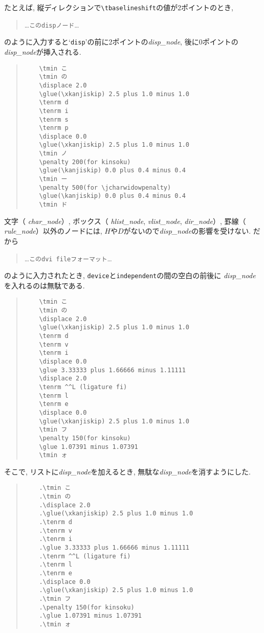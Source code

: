 たとえば, 縦ディレクションで\verb|\tbaselineshift|の値が2ポイントのとき,
\begin{quote}\gt
	\ldots\verb|このdispノード|\ldots
\end{quote}
のように入力すると`\verb|disp|'の前に2ポイントの{\it disp\_node\/},
後に0ポイントの{\it disp\_node\/}が挿入される.
\begin{quote}\gt\begin{verbatim}
	\tmin こ
	\tmin の
	\displace 2.0
	\glue(\xkanjiskip) 2.5 plus 1.0 minus 1.0
	\tenrm d
	\tenrm i
	\tenrm s
	\tenrm p
	\displace 0.0
	\glue(\xkanjiskip) 2.5 plus 1.0 minus 1.0
	\tmin ノ
	\penalty 200(for kinsoku)
	\glue(\kanjiskip) 0.0 plus 0.4 minus 0.4
	\tmin ー
	\penalty 500(for \jcharwidowpenalty)
	\glue(\kanjiskip) 0.0 plus 0.4 minus 0.4
	\tmin ド
\end{verbatim} \end{quote}
文字（\kern0pt {\it char\_node\/}）,
ボックス（\kern0pt {\it hlist\_node\/}, {\it vlist\_node\/}, {\it dir\_node\/}）,
罫線（\kern0pt {\it rule\_node\/}）以外のノードには,
$H$や$D$がないので{\it disp\_node\/}の影響を受けない.
だから
\begin{quote}\gt
	\ldots\verb|このdvi fileフォーマット|\ldots
\end{quote}
のように入力されたとき, \verb|device|と\verb|independent|の間の空白の前後に
{\it disp\_node\/}を入れるのは無駄である.
\begin{quote}\gt\begin{verbatim}
	\tmin こ
	\tmin の
	\displace 2.0
	\glue(\xkanjiskip) 2.5 plus 1.0 minus 1.0
	\tenrm d
	\tenrm v
	\tenrm i
	\displace 0.0
	\glue 3.33333 plus 1.66666 minus 1.11111
	\displace 2.0
	\tenrm ^^L (ligature fi)
	\tenrm l
	\tenrm e
	\displace 0.0
	\glue(\xkanjiskip) 2.5 plus 1.0 minus 1.0
	\tmin フ
	\penalty 150(for kinsoku)
	\glue 1.07391 minus 1.07391
	\tmin ォ
\end{verbatim} \end{quote}
そこで, リストに{\it disp\_node\/}を加えるとき,
無駄な{\it disp\_node\/}を消すようにした.
\begin{quote}\gt\begin{verbatim}
	.\tmin こ
	.\tmin の
	.\displace 2.0
	.\glue(\xkanjiskip) 2.5 plus 1.0 minus 1.0
	.\tenrm d
	.\tenrm v
	.\tenrm i
	.\glue 3.33333 plus 1.66666 minus 1.11111
	.\tenrm ^^L (ligature fi)
	.\tenrm l
	.\tenrm e
	.\displace 0.0
	.\glue(\xkanjiskip) 2.5 plus 1.0 minus 1.0
	.\tmin フ
	.\penalty 150(for kinsoku)
	.\glue 1.07391 minus 1.07391
	.\tmin ォ
\end{verbatim} \end{quote}

